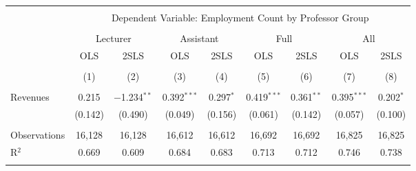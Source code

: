 
\begin{tabular}{@{\extracolsep{5pt}}lcccccccc} 
\\[-1.8ex]\hline 
\hline \\[-1.8ex] 
 & \multicolumn{8}{c}{Dependent Variable: Employment Count by Professor Group} \\ 
\cline{2-9} 
\\[-1.8ex] & \multicolumn{2}{c}{Lecturer} & \multicolumn{2}{c}{Assistant} & \multicolumn{2}{c}{Full} & \multicolumn{2}{c}{All} \\ 
 & OLS & 2SLS & OLS & 2SLS & OLS & 2SLS & OLS & 2SLS \\ 
\\[-1.8ex] & (1) & (2) & (3) & (4) & (5) & (6) & (7) & (8)\\ 
\hline \\[-1.8ex] 
 Revenues & 0.215 & $-$1.234$^{**}$ & 0.392$^{***}$ & 0.297$^{*}$ & 0.419$^{***}$ & 0.361$^{**}$ & 0.395$^{***}$ & 0.202$^{*}$ \\ 
  & (0.142) & (0.490) & (0.049) & (0.156) & (0.061) & (0.142) & (0.057) & (0.100) \\ 
 \hline \\[-1.8ex] 
Observations & 16,128 & 16,128 & 16,612 & 16,612 & 16,692 & 16,692 & 16,825 & 16,825 \\ 
R$^{2}$ & 0.669 & 0.609 & 0.684 & 0.683 & 0.713 & 0.712 & 0.746 & 0.738 \\ 
\hline 
\hline \\[-1.8ex] 
\end{tabular} 
